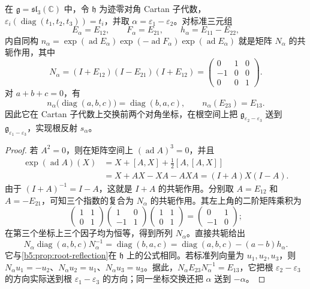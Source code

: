 \begin{proposition}\label{b5:prop:sl3-root-reflection-matrix}
	在 \(\mathfrak g=\mathfrak{sl}_3(\mathbb C)\) 中，令 \(\mathfrak h\) 为迹零对角 Cartan 子代数， \(\varepsilon_i(\operatorname{diag}(t_1,t_2,t_3))=t_i\)，并取 \(\alpha=\varepsilon_1-\varepsilon_2\)。对标准三元组
	\[
		E_\alpha=E_{12},\qquad F_\alpha=E_{21},\qquad h_\alpha=E_{11}-E_{22},
	\]
	内自同构 \(n_\alpha=\exp(\operatorname{ad}E_\alpha) \exp(-\operatorname{ad}F_\alpha) \exp(\operatorname{ad}E_\alpha)\) 就是矩阵 \(N_\alpha\) 的共轭作用，其中
	\[
		N_\alpha=(I+E_{12})(I-E_{21})(I+E_{12})
		=\begin{pmatrix}0&1&0\\-1&0&0\\0&0&1\end{pmatrix}.
	\]
	对 \(a+b+c=0\)，有
	\[
		n_\alpha\bigl(\operatorname{diag}(a,b,c)\bigr) =\operatorname{diag}(b,a,c),\qquad n_\alpha(E_{23})=E_{13}.
	\]
	因此它在 Cartan 子代数上交换前两个对角坐标，在根空间上把 \(\mathfrak g_{\varepsilon_2-\varepsilon_3}\) 送到 \(\mathfrak g_{\varepsilon_1-\varepsilon_3}\)，实现根反射 \(s_\alpha\)。
\end{proposition}
\begin{proof}
	若 \(A^2=0\)，则在矩阵空间上 \((\operatorname{ad}A)^3=0\)，并且
	\[
		\begin{aligned}
			\exp(\operatorname{ad}A)(X) &=X+[A,X]+\frac12[A,[A,X]]\\
			&=X+AX-XA-AXA=(I+A)X(I-A).
		\end{aligned}
	\]
	由于 \((I+A)^{-1}=I-A\)，这就是 \(I+A\) 的共轭作用。分别取 \(A=E_{12}\) 和 \(A=-E_{21}\)，可知三个指数的复合为 \(N_\alpha\) 的共轭作用。其左上角的二阶矩阵乘积为
	\[
		\begin{pmatrix}1&1\\0&1\end{pmatrix}
		\begin{pmatrix}1&0\\-1&1\end{pmatrix}
		\begin{pmatrix}1&1\\0&1\end{pmatrix}
		=\begin{pmatrix}0&1\\-1&0\end{pmatrix};
	\]
	在第三个坐标上三个因子均为恒等，得到所列 \(N_\alpha\)。直接共轭给出
	\[
		N_\alpha\operatorname{diag}(a,b,c)N_\alpha^{-1} =\operatorname{diag}(b,a,c) =\operatorname{diag}(a,b,c)-(a-b)h_\alpha.
	\]
	它与\cref{b5:prop:root-reflection}在 \(\mathfrak h\) 上的公式相同。若标准列向量为 \(u_1,u_2,u_3\)，则 \(N_\alpha u_1=-u_2\)、\(N_\alpha u_2=u_1\)、\(N_\alpha u_3=u_3\)。据此，\(N_\alpha E_{23}N_\alpha^{-1}=E_{13}\)，它把根 \(\varepsilon_2-\varepsilon_3\) 的方向实际送到根 \(\varepsilon_1-\varepsilon_3\) 的方向；同一坐标交换还把 \(\alpha\) 送到 \(-\alpha\)。
\end{proof}
